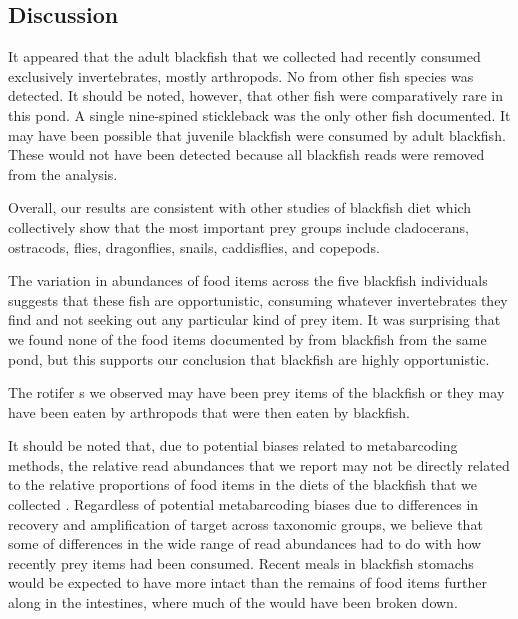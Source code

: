 \begin{multicols}{2} 

\section{Discussion}

It appeared that the adult blackfish that we collected had recently consumed exclusively invertebrates, mostly arthropods. No  from other fish species was detected. It should be noted, however, that other fish were comparatively rare in this pond. A single nine-spined stickleback was the only other fish documented. It may have been possible that juvenile blackfish were consumed by adult blackfish. These would not have been detected because all blackfish reads were removed from the analysis.

Overall, our results are consistent with other studies of blackfish diet \citep{OstdiekNardone1959, Chlupach1975, Gudkov1998, Eidam2015, Eidametal2016, Bowseretal2019} which collectively show that the most important prey groups
include cladocerans, ostracods, flies, dragonflies, snails, caddisflies,
and copepods.

The variation in abundances of food items across the five blackfish individuals suggests that these fish are opportunistic, consuming whatever invertebrates they find and not seeking out any particular kind of prey item. It was surprising that we found none of the food items documented by \citet{Bowseretal2019} from blackfish from the same pond, but this supports our conclusion that blackfish are highly opportunistic.  


The rotifer s we observed may have been prey items of the blackfish or they may have been eaten by arthropods that were then eaten by blackfish. 

It should be noted that, due to potential biases related to metabarcoding methods, the relative read abundances that we report may not be directly related to the relative proportions of food items in the diets of the blackfish that we collected \citep[see][for an overview]{Deagleetal2018}. Regardless of potential metabarcoding biases due to differences in recovery and amplification of target  across taxonomic groups, we believe that some of differences in the wide range of read abundances had to do with how recently prey items had been consumed. Recent meals in blackfish stomachs would be expected to have more intact  than the remains of food items further along in the intestines, where much of the  would have been broken down. 


\end{multicols}
